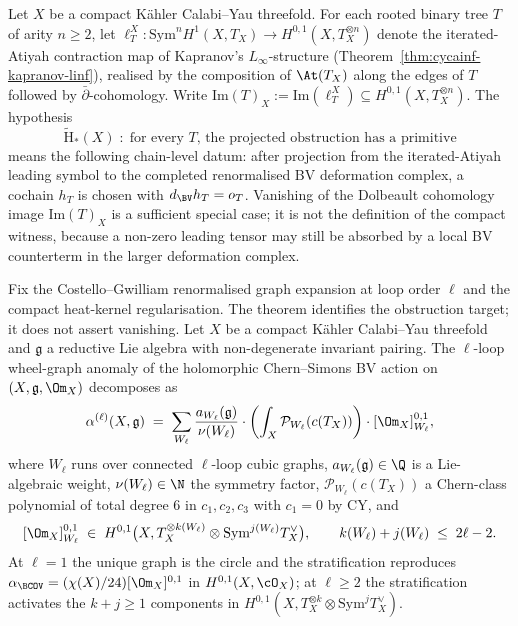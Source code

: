 \begin{definition}
\label{def:cycainf-h-tilde-star}
Let $X$ be a compact K\"ahler Calabi--Yau threefold. For each rooted
binary tree $T$ of arity $n \geq 2$, let $\ell_T^X : \mathrm{Sym}^n
H^1(X, T_X) \to H^{0,1}(X, T_X^{\otimes n})$ denote the iterated-Atiyah
contraction map of Kapranov's $L_\infty$-structure
(Theorem~\ref{thm:cycainf-kapranov-linf}), realised by the composition
of $\At(T_X)$ along the edges of $T$ followed by $\bar\partial$-cohomology.
Write $\mathrm{Im}(T)_X := \mathrm{Im}(\ell_T^X) \subseteq H^{0,1}(X,
T_X^{\otimes n})$. The hypothesis
\[
 \widetilde{\mathrm H}_*(X)
 \;:\;
 \text{for every $T$, the projected obstruction has a primitive}
\]
means the following chain-level datum: after projection from the
iterated-Atiyah leading symbol to the completed renormalised BV
deformation complex, a cochain $h_T$ is chosen with
$d_{\BV} h_T=o_T$. Vanishing of the Dolbeault cohomology image
$\mathrm{Im}(T)_X$ is a sufficient special case; it is not the definition
of the compact witness, because a non-zero leading tensor may still be
absorbed by a local BV counterterm in the larger deformation complex.
\end{definition}

\begin{theorem}
\label{thm:cycainf-ell-loop-stratification}
Fix the Costello--Gwilliam renormalised graph expansion at loop order
$\ell$ and the compact heat-kernel regularisation. The theorem
identifies the obstruction target; it does not assert vanishing.
Let $X$ be a compact K\"ahler Calabi--Yau threefold and $\mathfrak g$
a reductive Lie algebra with non-degenerate invariant pairing. The
$\ell$-loop wheel-graph anomaly of the holomorphic Chern--Simons BV
action on $(X, \mathfrak g, \Om_X)$ decomposes as
\[
 \alpha^{(\ell)}(X, \mathfrak g)
 \;=\;
 \sum_{W_\ell} \frac{a_{W_\ell}(\mathfrak g)}{\nu(W_\ell)}
 \cdot \left(\int_X \mathcal P_{W_\ell}(c(T_X))\right)
 \cdot [\Om_X]^{0,1}_{W_\ell},
\]
where $W_\ell$ runs over connected $\ell$-loop cubic graphs,
$a_{W_\ell}(\mathfrak g) \in \Q$ is a Lie-algebraic weight,
$\nu(W_\ell) \in \N$ the symmetry factor, $\mathcal P_{W_\ell}(c(T_X))$
a Chern-class polynomial of total degree $6$ in $c_1, c_2, c_3$ with
$c_1 = 0$ by CY, and
\[
 [\Om_X]^{0,1}_{W_\ell} \;\in\; H^{0,1}\bigl(X, T_X^{\otimes k(W_\ell)}
 \otimes \mathrm{Sym}^{j(W_\ell)} T_X^\vee\bigr),
 \qquad k(W_\ell) + j(W_\ell) \;\leq\; 2\ell - 2.
\]
At $\ell = 1$ the unique graph is the circle and the stratification
reproduces $\alpha_{\BCOV} = (\chi(X)/24) [\Om_X]^{0,1}$ in
$H^{0,1}(X, \cO_X)$; at $\ell \geq 2$ the stratification activates
the $k + j \geq 1$ components in $H^{0,1}(X, T_X^{\otimes k} \otimes
\mathrm{Sym}^j T_X^\vee)$.
\end{theorem}

